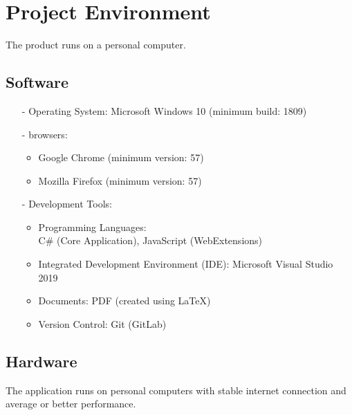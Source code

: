 \chapter{Project Environment}
\label{ch:environment}

The product runs on a personal computer.

\section{Software}
\begin{itemize}
\item[-] Operating System: Microsoft Windows 10 (minimum build: 1809)
\item[-] \Glspl{browser}:
	\begin{itemize}
	\item Google Chrome (minimum version: 57)
	\item Mozilla Firefox (minimum version: 57)
	\end{itemize}

\item[-] Development Tools:
	\begin{itemize}
	\item Programming Languages: \\C\# (Core Application), JavaScript (WebExtensions)
	\item Integrated Development Environment (IDE): Microsoft Visual Studio 2019
	\item Documents: PDF (created using LaTeX)
	\item Version Control: Git (GitLab)
	\end{itemize}
\end{itemize}
\section{Hardware}

The application runs on personal computers with stable internet connection and average or better performance.